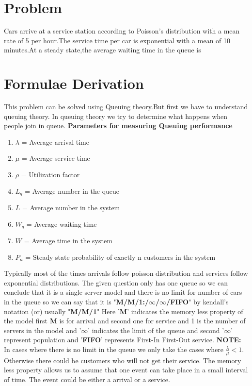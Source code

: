 \documentclass[journal,12pt,twocolumn]{IEEEtran}
\begin{document}
\section{Problem}
Cars arrive at a service station according to Poisson's distribution with a mean rate of 5 per hour.The service time per car is exponential with a mean of 10 minutes.At a steady state,the average waiting time in the queue is 
\section{Formulae Derivation}
This problem can be solved using Queuing theory.But first we have to understand queuing theory.
\newline In queuing theory we try to determine what happens when people join in queue.
\newline \textbf{Parameters for measuring Queuing performance}
\begin{enumerate}
    \item $\lambda$ = Average arrival time
    \item $\mu$ = Average service time
    \item $\rho$ = Utilization factor
    \item $L_q$ = Average number in the queue
    \item $L$ = Average number in the system
    \item $W_q$ = Average waiting time
    \item $W$ = Average time in the system
    \item $P_n$ = Steady state probability of exactly n customers in the system
\end{enumerate}
Typically most of the times arrivals follow poisson distribution and services follow exponential distributions.
\newline The given question only has one queue so we can conclude that it is a single server model and there is no limit for number of cars in the queue so we can say that it is "\textbf{M/M/1:/$\infty$/$\infty$/FIFO}" by kendall's notation (or) usually "\textbf{M/M/1}" 
\newline Here '\textbf{M}' indicates the memory less property of the model first \textbf{M} is for arrival and second one for service and 1 is the number of servers in the model and '$\infty$' indicates the limit of the queue and second '$\infty$' represent population and '\textbf{FIFO}' represents First-In First-Out service.
\newline \textbf{NOTE:} In cases where there is no limit in the queue we only take the cases where $\frac{\lambda}{\mu}<1$. Otherwise there could be customers who will not get their service. \newline The memory less property allows us to assume that one event can take place in a small interval of time. The event could be either a arrival or a service.
\end{document}
